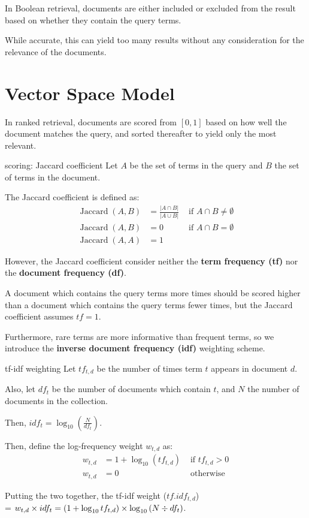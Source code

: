 In Boolean retrieval, documents are either included or excluded from the result based on whether they contain the query terms.

While accurate, this can yield too many results without any consideration for the relevance of the documents.

\section{Vector Space Model}
In ranked retrieval, documents are scored from $[0, 1]$ based on how well the document matches the query, and sorted thereafter to yield only the most relevant.

\begin{defn}{scoring: Jaccard coefficient}
    Let $A$ be the set of terms in the query and $B$ the set of terms in the document.

    The Jaccard coefficient is defined as:\vspace{0.8em}
    \begin{align*}
        \operatorname{Jaccard}(A, B) & = \frac{|A \cap B|}{|A \cup B|} & \text{ if } A \cap B \neq \emptyset \\
        \operatorname*{Jaccard}(A, B) & = 0 & \text{ if } A \cap B = \emptyset \\
        \operatorname*{Jaccard}(A, A) & = 1
    \end{align*}
\end{defn}

However, the Jaccard coefficient consider neither the \textbf{term frequency (tf)} nor the \textbf{document frequency (df)}.

A document which contains the query terms more times should be scored higher than a document which contains the query terms fewer times, but the Jaccard coefficient assumes $tf = 1$.

Furthermore, rare terms are more informative than frequent terms, so we introduce the \textbf{inverse document frequency (idf)} weighting scheme.

\begin{defn}{tf-idf weighting}
    Let $tf_{t, d}$ be the number of times term $t$ appears in document $d$.

    Also, let $df_t$ be the number of documents which contain $t$, and
    $N$ the number of documents in the collection.
    
    Then, $idf_t = \log_{10}\left(\frac{N}{df_t}\right)$.

    Then, define the log-frequency weight $w_{t,d}$ as:\vspace{0.5em}
    \begin{align*}
        w_{t, d} & = 1 + \log_{10}(tf_{t, d}) & \text{ if } tf_{t, d} > 0 \\
        w_{t, d} & = 0 & \text{ otherwise }
    \end{align*}

    Putting the two together, the tf-idf weight ($tf.idf_{t,d}$) \\
    = $w_{t, d} \times idf_t \\
    = \left(1 + \log_{10}tf_{t, d}\right) \times \log_{10}\left(N \div df_t\right)$.
\end{defn}

